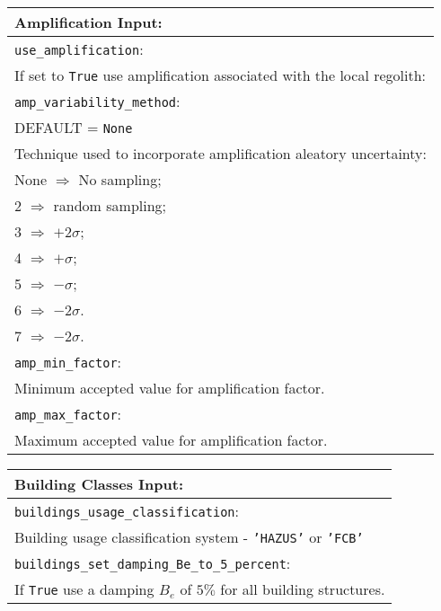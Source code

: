 \documentclass[a4paper, 12pt]{report}
\begin{document}
\vspace{2em}
\begin{tabular}{|p{\textwidth}|}
\hline
\vspace{0.3em} \noindent \Large \textbf{Amplification Input:} \normalsize \\
\hline \vspace{0.1em} \texttt{use\_amplification}: \\
If set to \texttt{True} use amplification associated with the local regolith: \\
\hline \vspace{0.1em} \texttt{amp\_variability\_method}: \\
DEFAULT = \texttt{None} \\
Technique used to incorporate amplification aleatory uncertainty: \\
 \hspace{0.5em} None $\Rightarrow$ No sampling; \\
 \hspace{0.5em} 2 $\Rightarrow$ random sampling; \\
 \hspace{0.5em} 3 $\Rightarrow$ $+2\sigma$; \\
 \hspace{0.5em} 4 $\Rightarrow$ $+\sigma$; \\
 \hspace{0.5em} 5 $\Rightarrow$ $-\sigma$; \\
 \hspace{0.5em} 6 $\Rightarrow$ $-2\sigma$.\\
 \hspace{0.5em} 7 $\Rightarrow$ $-2\sigma$.\\
\hline \vspace{0.1em} \texttt{amp\_min\_factor}: \\
Minimum accepted value for amplification factor.    \\
\hline \vspace{0.1em} \texttt{amp\_max\_factor}: \\
Maximum accepted value for amplification factor.   \\
\hline
\end{tabular}

\vspace{2em}
\begin{tabular}{|p{\textwidth}|}
\hline
\vspace{0.3em} \noindent \Large \textbf{Building Classes Input:} \normalsize \\
\hline \vspace{0.1em} \texttt{buildings\_usage\_classification}: \\
Building usage classification system - \texttt{'HAZUS'} or \texttt{'FCB'} \\
\hline \vspace{0.1em}
\texttt{buildings\_set\_damping\_Be\_to\_5\_percent}: \\
If \texttt{True} use a damping $B_e$ of $5\%$ for all building structures.\\
\hline
 \end{tabular}
\end{document}
